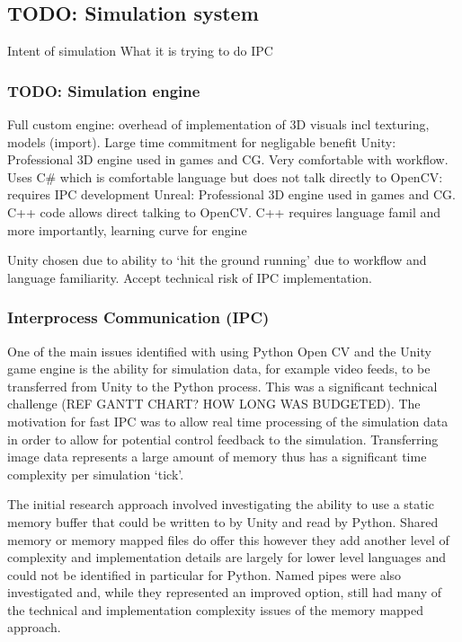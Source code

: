 \documentclass[]{aiaa-tc}%
\begin{document}
\subsection{TODO: Simulation system}

Intent of simulation
What it is trying to do
IPC

\subsubsection{TODO: Simulation engine} \label{s:simEngineChoice}

Full custom engine: overhead of implementation of 3D visuals incl texturing, models (import). Large time commitment for negligable benefit
Unity: Professional 3D engine used in games and CG. Very comfortable with workflow. Uses C\# which is comfortable language but does not talk directly to OpenCV: requires IPC development
Unreal: Professional 3D engine used in games and CG. C++ code allows direct talking to OpenCV. C++ requires language famil and more importantly, learning curve for engine

Unity chosen due to ability to `hit the ground running' due to workflow and language familiarity. Accept technical risk of IPC implementation.

\subsubsection{Interprocess Communication (IPC)} \label{s:IPC}

One of the main issues identified with using Python Open CV and the Unity game engine is the ability for simulation data, for example video feeds, to be transferred from Unity to the Python process. This was a significant technical challenge (REF GANTT CHART? HOW LONG WAS BUDGETED). The motivation for fast IPC was to allow real time processing of the simulation data in order to allow for potential control feedback to the simulation. Transferring image data represents a large amount of memory thus has a significant time complexity per simulation `tick'. 

The initial research approach involved investigating the ability to use a static memory buffer that could be written to by Unity and read by Python. Shared memory or memory mapped files do offer this however they add another level of complexity and implementation details are largely for lower level languages and could not be identified in particular for Python. Named pipes were also investigated and, while they represented an improved option, still had many of the technical and implementation complexity issues of the memory mapped approach.
\end{document}

